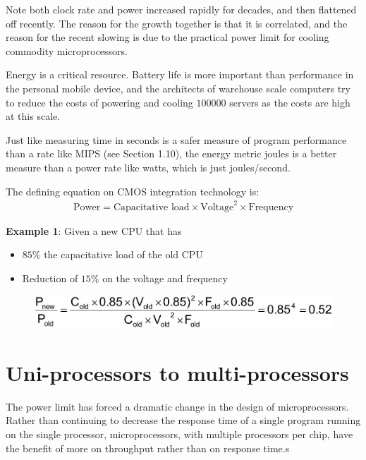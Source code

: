 \documentclass[10pt,a4paper]{article}
\begin{document}
Note both clock rate and power increased rapidly for decades, and then flattened off recently. The
reason for the growth together is that it is correlated, and the reason for the recent slowing is
due to the practical power limit for cooling commodity microprocessors.

Energy is a critical resource. Battery life is more important than performance in the personal
mobile device, and the architects of warehouse scale computers try to reduce the  costs of powering
and cooling $100 000$ servers as the costs are high at this scale. 

Just like measuring time in seconds is a safer measure of program performance than a 
rate like MIPS (see Section 1.10), the energy metric joules is a better measure than 
a power rate like watts, which is just joules/second.

The defining equation on CMOS integration technology is:
\begin{align*}
    \text{Power} = \text{Capacitative load}\times \text{Voltage}^2 \times \text{Frequency}
\end{align*}

\textbf{Example 1}: Given a new CPU that has 
\begin{itemize}
    \item $85\%$ the capacitative load of the old CPU
    \item Reduction of $15\%$ on the voltage and frequency
\end{itemize} 
\begin{figure} [h!]
    \centering
    \includegraphics[scale=0.4]{Eq.JPG}
\end{figure}

\pagebreak

\section{Uni-processors to multi-processors}

The power limit has forced a dramatic change in the design of microprocessors. Rather than
continuing to decrease the response time of a single program running on the single processor,
microprocessors, with multiple processors per chip, have the benefit of more on throughput rather
than on response time.s
\end{document}
